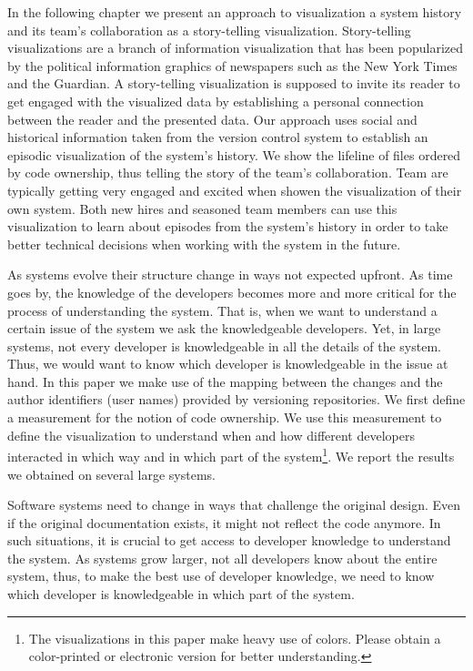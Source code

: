 \documentclass[10pt]{book}
\begin{document}
In the following chapter we present an approach to visualization a system history and its team's collaboration as a story-telling visualization. Story-telling visualizations are a branch of information visualization that has been popularized by the political information graphics of newspapers such as the New York Times and the Guardian. A story-telling visualization is supposed to invite its reader to get engaged with the visualized data by establishing a personal connection between the reader and the presented data. Our approach uses social and historical information taken from the version control system to establish an episodic visualization of the system's history. We show the lifeline of files ordered by code ownership, thus telling the story of the team's collaboration. Team are typically getting very engaged and excited when showen the visualization of their own system. Both new hires and seasoned team members can use this visualization to learn about episodes from the system's history in order to take better technical decisions when working with the system in the future.

\asteriskasteriskasterisk

As systems evolve their structure change in ways not expected upfront. As time goes by, the knowledge of the developers becomes more and more critical for the process of understanding the system. That is, when we want to understand a certain issue of the system we ask the knowledgeable developers. Yet, in large systems, not every developer is knowledgeable in all the details of the system. Thus, we would want to know which developer is knowledgeable in the issue at hand. In this paper we make use of the mapping between the changes and the author identifiers (\eg user names) provided by versioning repositories. We first define a measurement for the notion of code ownership. We use this measurement to define the \omap visualization to understand when and how different developers interacted in which way and in which part of the system\footnote{The visualizations in this paper make heavy use of colors. Please obtain a color-printed or electronic version for better understanding.}. We report the results we obtained on several large systems.

Software systems need to change in ways that challenge the original design. Even if the original documentation exists, it might not reflect the code anymore. In such situations, it is crucial to get access to developer knowledge to understand the system. As systems grow larger, not all developers know about the entire system, thus, to make the best use of developer knowledge, we need to know which developer is knowledgeable in which part of the system.
\end{document}

